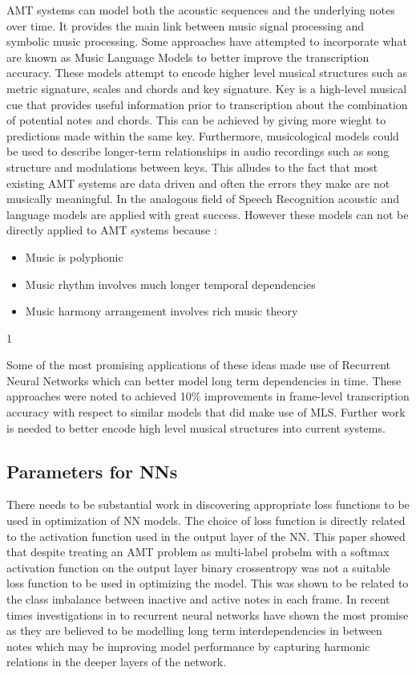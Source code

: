 AMT systems can model both the acoustic sequences and the underlying notes over
time. It provides the main link between music signal processing and symbolic
music processing. Some approaches have attempted to incorporate what are known
as Music Language Models to better improve the transcription accuracy. These
models attempt to encode higher level musical structures such as metric
signature, scales and chords and key signature. Key is a high-level musical cue
that provides useful information prior to transcription about the combination of
potential notes and chords. This can be achieved by giving more wieght to
predictions made within the same key. Furthermore, musicological models could be
used to describe longer-term relationships in audio recordings such as song
structure and modulations between keys. This alludes to the fact that most
existing AMT systems are data driven and often the errors they make are not
musically meaningful. In the analogous field of Speech Recognition acoustic and
language models are applied with great success. However these models can not be
directly applied to AMT systems because :
\begin{itemize}
    \item Music is polyphonic
    \item Music rhythm involves much longer temporal dependencies
    \item Music harmony arrangement involves rich music theory \end{itemize}1

Some of the most promising applications of these ideas made use of Recurrent
Neural Networks which can better model long term dependencies in time. These
approaches were noted to achieved 10\% improvements in frame-level transcription
accuracy with respect to similar models that did make use of MLS. Further work
is needed to better encode high level musical structures into current systems.
\cite{amt-note-to-audio:Lewandowski,end-to-end-nn-2016:Sigtia}

\subsection{Parameters for NNs}
There needs to be substantial work in discovering appropriate loss functions to
be used in optimization of NN models. The choice of loss function is directly
related to the activation function used in the output layer of the NN. This
paper showed that despite treating an AMT problem as multi-label probelm with a
softmax activation function on the output layer binary crossentropy was not a
suitable loss function to be used in optimizing the model. This was shown to be
related to the class imbalance between inactive and active notes in each frame.
In recent times investigations in to recurrent neural networks have shown the
most promise as they are believed to be modelling long term interdependencies in
between notes which may be improving model performance by capturing harmonic
relations in the deeper layers of the network.
\cite{end-to-end-nn-2016:Sigtia,amt-note-to-audio:Lewandowski}


